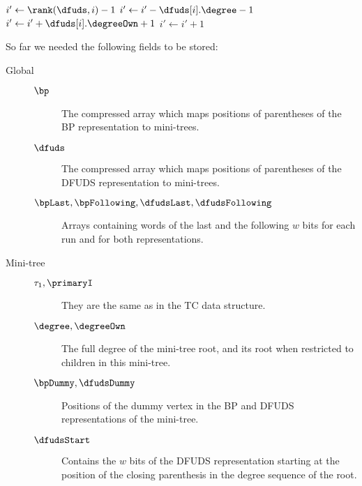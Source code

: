 \begin{algorithm}
\begin{algorithmic}
	\State $i' \gets \rank(\dfuds, i) - 1$
	 
		\State $i' \gets i' - \dfuds[i].\degree - 1$ 
	\EndIf
	\State $i' \gets i' + \dfuds[i].\degreeOwn + 1$ 
	 
		\State $i' \gets i' + 1$ 
	\EndIf
\EndFunction
\end{algorithmic}
\end{algorithm}

So far we needed the following fields to be stored:
\begin{description}
	\item[Global]
	\begin{description}
		\item[]
		
		\item[$\bp$]
		The compressed array which maps positions of parentheses of the BP representation to mini-trees.
		
		\item[$\dfuds$]
		The compressed array which maps positions of parentheses of the DFUDS representation to mini-trees.
		
		\item[$\bpLast, \bpFollowing, \dfudsLast, \dfudsFollowing$]
		Arrays containing words of the last and the following $w$ bits for each run and for both representations.
	\end{description}
	
	\item[Mini-tree]
	\begin{description}
		\item[]
		
		\item[$\tau_1, \primaryI$]
		They are the same as in the TC data structure.
		
		\item[$\degree, \degreeOwn$]
		The full degree of the mini-tree root, and its root when restricted to children in this mini-tree. 
		
		\item[$\bpDummy, \dfudsDummy$]
		Positions of the dummy vertex in the BP and DFUDS representations of the mini-tree.
		
		\item[$\dfudsStart$]
		Contains the $w$ bits of the DFUDS representation starting at the position of the closing parenthesis in the degree sequence of the root.
	\end{description}
\end{description}

